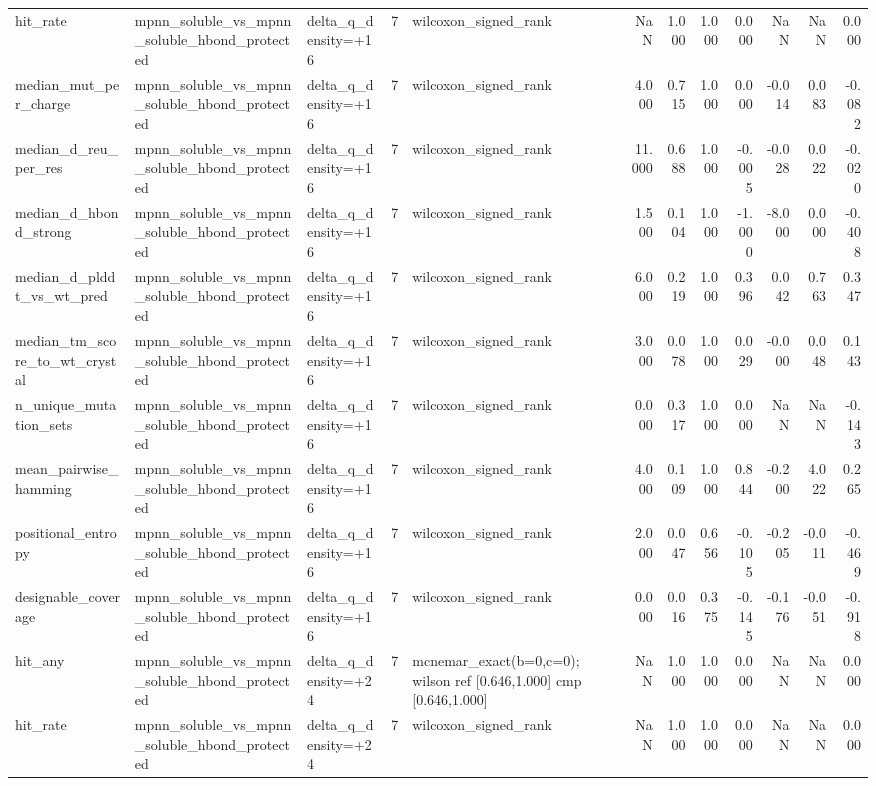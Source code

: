 \begin{table}
{\begin{tabular}{lllrlrrrrrrr}
hit\_rate & mpnn\_soluble\_vs\_mpnn\_soluble\_hbond\_protected & delta\_q\_density=+16 & 7 & wilcoxon\_signed\_rank & NaN & 1.000 & 1.000 & 0.000 & NaN & NaN & 0.000 \\
median\_mut\_per\_charge & mpnn\_soluble\_vs\_mpnn\_soluble\_hbond\_protected & delta\_q\_density=+16 & 7 & wilcoxon\_signed\_rank & 4.000 & 0.715 & 1.000 & 0.000 & -0.014 & 0.083 & -0.082 \\
median\_d\_reu\_per\_res & mpnn\_soluble\_vs\_mpnn\_soluble\_hbond\_protected & delta\_q\_density=+16 & 7 & wilcoxon\_signed\_rank & 11.000 & 0.688 & 1.000 & -0.005 & -0.028 & 0.022 & -0.020 \\
median\_d\_hbond\_strong & mpnn\_soluble\_vs\_mpnn\_soluble\_hbond\_protected & delta\_q\_density=+16 & 7 & wilcoxon\_signed\_rank & 1.500 & 0.104 & 1.000 & -1.000 & -8.000 & 0.000 & -0.408 \\
median\_d\_plddt\_vs\_wt\_pred & mpnn\_soluble\_vs\_mpnn\_soluble\_hbond\_protected & delta\_q\_density=+16 & 7 & wilcoxon\_signed\_rank & 6.000 & 0.219 & 1.000 & 0.396 & 0.042 & 0.763 & 0.347 \\
median\_tm\_score\_to\_wt\_crystal & mpnn\_soluble\_vs\_mpnn\_soluble\_hbond\_protected & delta\_q\_density=+16 & 7 & wilcoxon\_signed\_rank & 3.000 & 0.078 & 1.000 & 0.029 & -0.000 & 0.048 & 0.143 \\
n\_unique\_mutation\_sets & mpnn\_soluble\_vs\_mpnn\_soluble\_hbond\_protected & delta\_q\_density=+16 & 7 & wilcoxon\_signed\_rank & 0.000 & 0.317 & 1.000 & 0.000 & NaN & NaN & -0.143 \\
mean\_pairwise\_hamming & mpnn\_soluble\_vs\_mpnn\_soluble\_hbond\_protected & delta\_q\_density=+16 & 7 & wilcoxon\_signed\_rank & 4.000 & 0.109 & 1.000 & 0.844 & -0.200 & 4.022 & 0.265 \\
positional\_entropy & mpnn\_soluble\_vs\_mpnn\_soluble\_hbond\_protected & delta\_q\_density=+16 & 7 & wilcoxon\_signed\_rank & 2.000 & 0.047 & 0.656 & -0.105 & -0.205 & -0.011 & -0.469 \\
designable\_coverage & mpnn\_soluble\_vs\_mpnn\_soluble\_hbond\_protected & delta\_q\_density=+16 & 7 & wilcoxon\_signed\_rank & 0.000 & 0.016 & 0.375 & -0.145 & -0.176 & -0.051 & -0.918 \\
hit\_any & mpnn\_soluble\_vs\_mpnn\_soluble\_hbond\_protected & delta\_q\_density=+24 & 7 & mcnemar\_exact(b=0,c=0); wilson ref [0.646,1.000] cmp [0.646,1.000] & NaN & 1.000 & 1.000 & 0.000 & NaN & NaN & 0.000 \\
hit\_rate & mpnn\_soluble\_vs\_mpnn\_soluble\_hbond\_protected & delta\_q\_density=+24 & 7 & wilcoxon\_signed\_rank & NaN & 1.000 & 1.000 & 0.000 & NaN & NaN & 0.000 \\

\end{tabular}}
\end{table}
